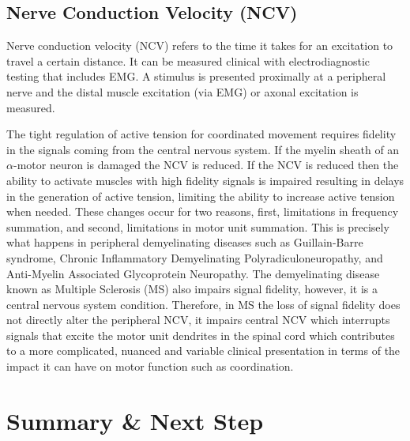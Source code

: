 \subsection{Nerve Conduction Velocity (NCV)}

Nerve conduction velocity (NCV) refers to the time it takes for an excitation to travel a certain distance. It can be measured clinical with electrodiagnostic testing that includes EMG. A stimulus is presented proximally at a peripheral nerve and the distal muscle excitation (via EMG) or axonal excitation is measured.

The tight regulation of active tension for coordinated movement requires fidelity in the signals coming from the central nervous system.\footnotemark{} If the myelin sheath of an $\alpha$-motor neuron is damaged the NCV is reduced. If the NCV is reduced then the ability to activate muscles with high fidelity signals is impaired resulting in delays in the generation of active tension, limiting the ability to increase active tension when needed. These changes occur for two reasons, first, limitations in frequency summation, and second, limitations in motor unit summation. This is precisely what happens in peripheral demyelinating diseases such as Guillain-Barre syndrome, Chronic Inflammatory Demyelinating Polyradiculoneuropathy, and Anti-Myelin Associated Glycoprotein Neuropathy. The demyelinating disease known as Multiple Sclerosis (MS) also impairs signal fidelity, however, it is a central nervous system condition. Therefore, in MS the loss of signal fidelity does not directly alter the peripheral NCV, it impairs central NCV which interrupts signals that excite the motor unit dendrites in the spinal cord which contributes to a more complicated, nuanced and variable clinical presentation in terms of the impact it can have on motor function such as coordination.


\section{Summary \& Next Step}

